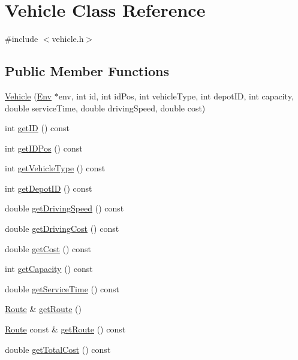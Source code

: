 \hypertarget{class_vehicle}{}\section{Vehicle Class Reference}
\label{class_vehicle}


{\ttfamily \#include $<$vehicle.\+h$>$}

\subsection*{Public Member Functions}
\begin{DoxyCompactItemize}
\item 
\hyperlink{class_vehicle_a5d6fef3888569a2f29ecb0027529592e}{Vehicle} (\hyperlink{class_env}{Env} $\ast$env, int id, int id\+Pos, int vehicle\+Type, int depot\+ID, int capacity, double service\+Time, double driving\+Speed, double cost)
\item 
int \hyperlink{class_vehicle_acea04d455b93f807dabbe850799636c4}{get\+ID} () const
\item 
int \hyperlink{class_vehicle_a3c0ba62b556694de7519910ff7c222b0}{get\+I\+D\+Pos} () const
\item 
int \hyperlink{class_vehicle_a6d561e79b80d8335c2b1d61b0a00ab55}{get\+Vehicle\+Type} () const
\item 
int \hyperlink{class_vehicle_a0952f9b75d0ff8df66e33e60521e0dc0}{get\+Depot\+ID} () const
\item 
double \hyperlink{class_vehicle_ac42193823beeb27ad51a8d78a541f970}{get\+Driving\+Speed} () const
\item 
double \hyperlink{class_vehicle_af242c980b1bfbc56d27ae4184c0f32c9}{get\+Driving\+Cost} () const
\item 
double \hyperlink{class_vehicle_a095c19748573c646c3eaf12581e4d969}{get\+Cost} () const
\item 
int \hyperlink{class_vehicle_ac1c0f2280c871eabc659e83e4d18252f}{get\+Capacity} () const
\item 
double \hyperlink{class_vehicle_ac3f306380304c8f87e741f96ee35c563}{get\+Service\+Time} () const
\item 
\hyperlink{class_route}{Route} \& \hyperlink{class_vehicle_a53ff209740804a59014c90eff4a4a386}{get\+Route} ()
\item 
\hyperlink{class_route}{Route} const  \& \hyperlink{class_vehicle_a0c5a76433d16b806fe5abdcfc8ffeb22}{get\+Route} () const
\item 
double \hyperlink{class_vehicle_a83d25c44fc48f4affd6d83bab54f98f0}{get\+Total\+Cost} () const

\end{DoxyCompactItemize}
